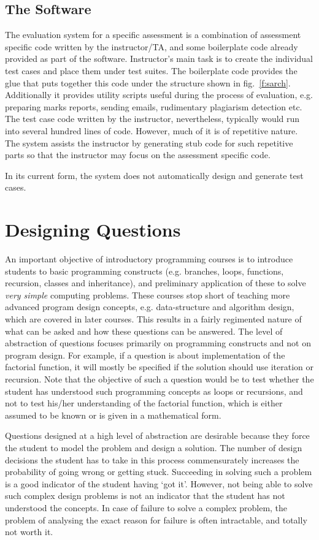 \documentclass[12pt]{article}
\begin{document}
 
\subsection{The Software}
The evaluation system for a specific assessment is a combination of assessment specific code written by the instructor/TA, and some boilerplate code already provided as part of the software. Instructor's main task is to create the individual test cases and place them under test suites. The boilerplate code provides the glue that puts together this code under the structure shown in fig.~\ref{f:sarch}. Additionally it provides utility scripts useful during the process of evaluation, e.g. preparing marks reports, sending emails, rudimentary plagiarism detection etc. The test case code written by the instructor, nevertheless, typically would run into several hundred lines of code. However, much of it is of repetitive nature. The system assists the instructor by generating stub code for such repetitive parts so that the instructor may focus on the assessment specific code.

In its current form, the system does not automatically design and generate test cases.

\section{Designing Questions}
An important objective of introductory programming courses is to introduce students to basic programming constructs (e.g. branches, loops, functions, recursion, classes and inheritance), and preliminary application of these to solve \emph{very simple} computing problems. These courses stop short of teaching more advanced program design concepts, e.g. data-structure and algorithm design, which are covered in later courses. This results in a fairly regimented nature of what can be asked and how these questions can be answered. The level of abstraction of questions focuses primarily on programming constructs and not on program design. For example, if a question is about implementation of the factorial function, it will mostly be specified if the solution should use iteration or recursion. Note that the objective of such a question would be to test whether the student has understood such programming concepts as loops or recursions, and not to test his/her understanding of the factorial function, which is either assumed to be known or is given in a mathematical form.

Questions designed at a high level of abstraction are desirable because they force the student to model the problem and design a solution. The number of design decisions the student has to take in this process commensurately increases the probability of going wrong or getting stuck. Succeeding in solving such a problem is a good indicator of the student having `got it'. However, not being able to solve such complex design problems is not an indicator that the student has not understood the concepts. In case of failure to solve a complex problem, the problem of analysing the exact reason for failure is often intractable, and totally not worth it.
\end{document}

